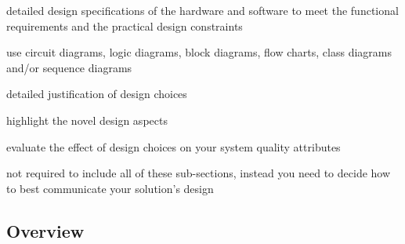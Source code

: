 \documentclass[../main.tex]{subfiles}
\begin{document}
\begin{newrequirements}
    \begin{todolist}
        \item [\done] detailed design specifications of the 
            hardware and software to meet the 
            functional requirements and the 
            practical design constraints 

        \item [\done] use circuit diagrams, logic diagrams, 
            block diagrams, flow charts, class 
            diagrams and/or sequence diagrams 

        \item [\done] detailed justification of design 
            choices 

        \item [\done] highlight the novel design aspects 

        \item evaluate the effect of design choices 
            on your system quality attributes 

        \item [\done] not required to include all of these 
            sub-sections, instead you need to 
            decide how to best communicate your 
            solution’s design
    \end{todolist}
\end{newrequirements}

\subsection{Overview}



\end{document}
